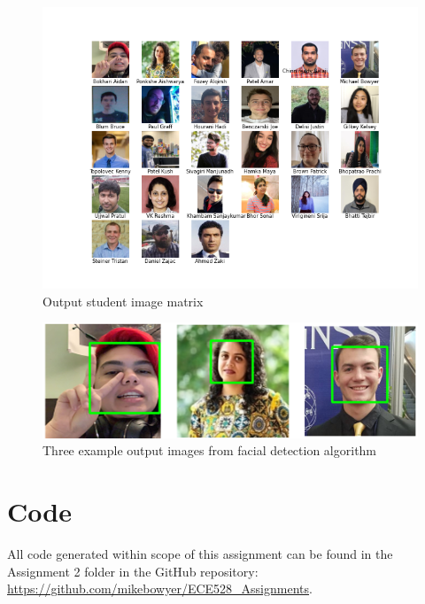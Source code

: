 \documentclass[12pt, letterpaper, final, onecolumn, titlepage] {article}
\begin{document}
\doublespacing

\begin{figure}[htbp]
	\centerline{\includegraphics{students.png}}
	\caption{Output student image matrix}
	\label{studentMatrix}
\end{figure}

\begin{figure}[htbp]
	\centerline{\includegraphics[scale=.75]{FacialDetectionImages/FacialDetection.png}}
	\caption{Three example output images from facial detection algorithm}
	\label{facialDetect}
\end{figure}

\pagebreak

\section{Code}

All code generated within scope of this assignment can be found in the Assignment 2 folder in the GitHub repository:
\url{https://github.com/mikebowyer/ECE528_Assignments}.
\end{document}
